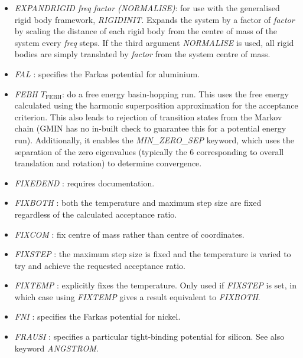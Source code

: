 \documentclass[12pt,a4paper,dvips]{article}
\begin{document}
\begin{itemize}
\item {\it EXPANDRIGID freq factor (NORMALISE)}: for use with the generalised rigid body framework, 
{\it RIGIDINIT}. Expands the system by a factor of {\it factor} by scaling the distance
of each rigid body from the centre of mass of the system every {\it freq} steps. If the third argument {\it NORMALISE}
is used, all rigid bodies are simply translated by {\it factor} from the system centre of mass.


\item {\it FAL \/}: specifies the Farkas potential for aluminium.

\item {\it FEBH $T_\text{FEBH}$\/}: do a free energy basin-hopping run. This uses the free energy
calculated using the harmonic superposition approximation for the acceptance criterion. This also
leads to rejection of transition states from the Markov chain (GMIN has no in-built check to guarantee
this for a potential energy run). Additionally, it enables the {\it MIN\_ZERO\_SEP \/} keyword, which 
uses the separation of the zero eigenvalues (typically the 6 corresponding to overall translation and 
rotation) to determine convergence.

\item {\it FIXEDEND \/}: requires documentation.

\item {\it FIXBOTH \/}: both the temperature and maximum step size are fixed regardless of
the calculated acceptance ratio.

\item {\it FIXCOM \/}: fix centre of mass rather than centre of coordinates.

\item {\it FIXSTEP \/}: the maximum step size is fixed and the temperature is varied to
try and achieve the requested acceptance ratio.

\item {\it FIXTEMP \/}: explicitly fixes the temperature. Only used if {\it FIXSTEP\/} is set, in 
which case using {\it FIXTEMP\/} gives a result equivalent to {\it FIXBOTH\/}.

\item {\it FNI \/}: specifies the Farkas potential for nickel.

\item {\it FRAUSI \/}: specifies a particular tight-binding potential for silicon.
See also keyword {\it ANGSTROM\/}.


\end{itemize}
\end{document}
